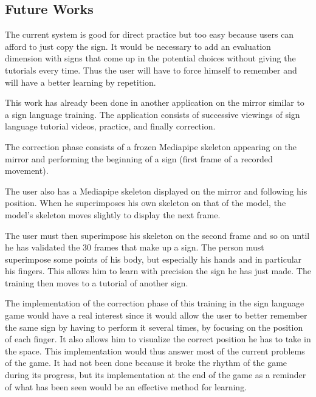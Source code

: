 \subsection{Future Works}

The current system is good for direct practice but too easy because users can afford to just copy the sign. It would be necessary to add an evaluation dimension with signs that come up in the potential choices without giving the tutorials every time. Thus the user will have to force himself to remember and will have a better learning by repetition.

This work has already been done in another application on the mirror similar to a sign language training. The application consists of successive viewings of sign language tutorial videos, practice, and finally correction. 

The correction phase consists of a frozen Mediapipe skeleton appearing on the mirror and performing the beginning of a sign (first frame of a recorded movement). 

The user also has a Mediapipe skeleton displayed on the mirror and following his position. When he superimposes his own skeleton on that of the model, the model's skeleton moves slightly to display the next frame. 

The user must then superimpose his skeleton on the second frame and so on until he has validated the 30 frames that make up a sign. The person must superimpose some points of his body, but especially his hands and in particular his fingers. This allows him to learn with precision the sign he has just made. The training then moves to a tutorial of another sign. 

The implementation of the correction phase of this training in the sign language game would have a real interest since it would allow the user to better remember the same sign by having to perform it several times, by focusing on the position of each finger. It also allows him to visualize the correct position he has to take in the space. 
This implementation would thus answer most of the current problems of the game. It had not been done because it broke the rhythm of the game during its progress, but its implementation at the end of the game as a reminder of what has been seen would be an effective method for learning.


